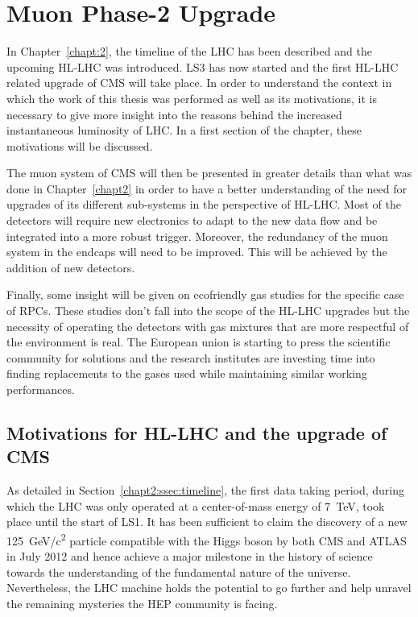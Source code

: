 \renewcommand\evenpagerightmark{{\scshape\small Chapter 4}}
\renewcommand\oddpageleftmark{{\scshape\small Muon Phase-2 Upgrade}}

\renewcommand{\bibname}{References}

\hyphenation{}

\chapter[Muon Phase-2 Upgrade]%
{Muon Phase-2 Upgrade}
\label{chapt:4}
		
	In Chapter~\ref{chapt:2}, the timeline of the LHC has been described and the upcoming \acl{HL-LHC} was introduced. LS3 has now started and the first HL-LHC related upgrade of CMS will take place. In order to understand the context in which the work of this thesis was performed as well as its motivations, it is necessary to give more insight into the reasons behind the increased instantaneous luminosity of LHC. In a first section of the chapter, these motivations will be discussed.
	
	The muon system of CMS will then be presented in greater details than what was done in Chapter~\ref{chapt2} in order to have a better understanding of the need for upgrades of its different sub-systems in the perspective of HL-LHC. Most of the detectors will require new electronics to adapt to the new data flow and be integrated into a more robust trigger. Moreover, the redundancy of the muon system in the endcaps will need to be improved. This will be achieved by the addition of new detectors.
	
	Finally, some insight will be given on ecofriendly gas studies for the specific case of \acl{RPC}s. These studies don't fall into the scope of the HL-LHC upgrades but the necessity of operating the detectors with gas mixtures that are more respectful of the environment is real. The European union is starting to press the scientific community for solutions and the research institutes are investing time into finding replacements to the gases used while maintaining similar working performances.
	
\section{Motivations for HL-LHC and the upgrade of CMS}
\label{chapt4:sec:motivations}

	As detailed in Section~\ref{chapt2:ssec:timeline}, the first data taking period, during which the LHC was only operated at a center-of-mass energy of \SI{7}{TeV}, took place until the start of LS1. It has been sufficient to claim the discovery of a new \SI{125}{GeV/c^2} particle compatible with the Higgs boson by both CMS and ATLAS in July 2012 and hence achieve a major milestone in the history of science towards the understanding of the fundamental nature of the universe. Nevertheless, the LHC machine holds the potential to go further and help unravel the remaining mysteries the \acf{HEP} community is facing.
	
